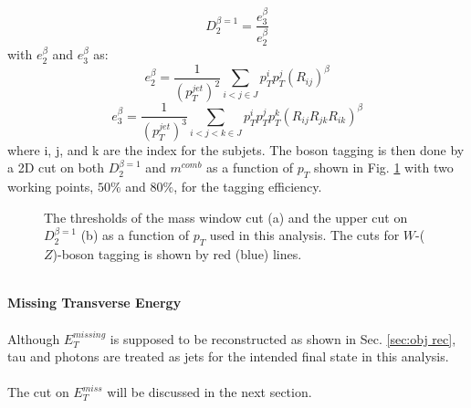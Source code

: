 \begin{equation}
D^{\beta =1}_{2} = \frac{e^{\beta}_{3}}{e^{\beta}_2} 
\end{equation}
with $e^{\beta}_{2}$ and $e^{\beta}_{3}$ as:
\begin{equation}
e^{\beta}_{2} = \frac{1}{(p_{T}^{jet})^2}\displaystyle\sum\limits_{i<j\in J}p_{T}^{i}p_{T}^j(R_{ij})^{\beta}
\end{equation}
\begin{equation}
e^{\beta}_{3} = \frac{1}{(p_{T}^{jet})^3}\displaystyle\sum\limits_{i<j<k\in J}p_{T}^{i}p_{T}^{j}p_{T}^{k}(R_{ij}R_{jk}R_{ik})^{\beta}
\end{equation}
where i, j, and k are the index for the subjets. The boson tagging is then done by a 2D cut on both $D^{\beta =1}_{2}$ and $m^{comb}$ as a function of $p_{T}$ shown in Fig. \ref{Fig:newWZtaggerWP} with two working points, $50\%$ and $80\%$, for the tagging efficiency. 
\begin{figure}[ht]
	\begin{center}
		\caption{The thresholds of the mass window cut (a) and the upper cut on $D^{\beta =1}_2$ (b) as a function of $p_{T}$ used in this analysis. The cuts  for $W$-($Z$)-boson tagging is shown by red (blue) lines.}
		\label{Fig:newWZtaggerWP}
	\end{center}
\end{figure}
\noindent
\\{\bf Missing Transverse Energy}
\\
\\Although $E^{missing}_{T}$ is supposed to be reconstructed as shown in Sec. \ref{sec:obj rec}, tau and photons are treated as jets for the intended final state in this analysis. 
\\
\\The cut on $E^{miss}_{T}$ will be discussed in the next section.   
